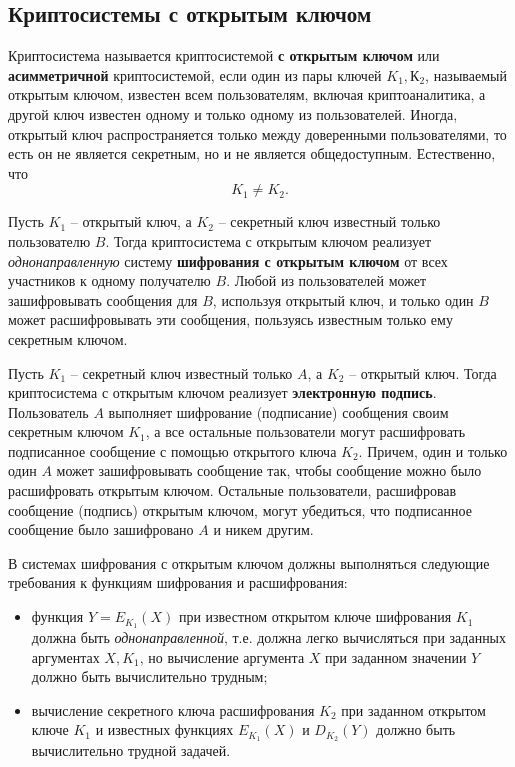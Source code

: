 \subsection{Криптосистемы с открытым ключом}

Криптосистема называется криптосистемой \textbf{с открытым ключом} или \textbf{асимметричной} криптосистемой, если один из пары ключей $K_1, К_2$, называемый открытым ключом, известен всем пользователям, включая криптоаналитика, а другой ключ известен одному и только одному из пользователей. Иногда, открытый ключ распространяется только между доверенными пользователями, то есть он не является секретным, но и не является общедоступным. Естественно, что
    \[ K_1 \neq K_2. \]

Пусть $K_1$ -- открытый ключ, а $K_2$ -- секретный ключ известный только пользователю $B$. Тогда криптосистема с открытым ключом реализует \emph{однонаправленную} систему \textbf{шифрования с открытым ключом} от всех участников к одному получателю $B$. Любой из пользователей может зашифровывать сообщения для $B$, используя открытый ключ, и только один $B$ может расшифровывать эти сообщения, пользуясь известным только ему секретным ключом.

Пусть $K_1$ -- секретный ключ известный только $A$, а $K_2$ -- открытый ключ. Тогда криптосистема с открытым ключом реализует \textbf{электронную подпись}. Пользователь $A$ выполняет шифрование (подписание) сообщения своим секретным ключом $K_1$, а все остальные пользователи могут расшифровать подписанное сообщение с помощью открытого ключа $K_2$. Причем, один и только один $A$ может зашифровывать сообщение так, чтобы сообщение можно было расшифровать открытым ключом. Остальные пользователи, расшифровав сообщение (подпись) открытым ключом, могут убедиться, что подписанное сообщение было зашифровано $A$ и никем другим.

В системах шифрования с открытым ключом должны выполняться следующие требования к функциям шифрования и расшифрования:
\begin{itemize}
   \item функция $Y = E_{K_1}(X)$ при известном открытом ключе шифрования $K_1$ должна быть \emph{однонаправленной}, т.е.  должна легко вычисляться при заданных аргументах $X, K_1$, но вычисление аргумента $X$ при заданном значении $Y$ должно быть вычислительно трудным;
   \item вычисление секретного ключа расшифрования $K_2$ при заданном открытом ключе $K_1$ и известных функциях $E_{K_1}(X)$ и $D_{K_2}(Y)$  должно быть вычислительно трудной задачей.
\end{itemize}

